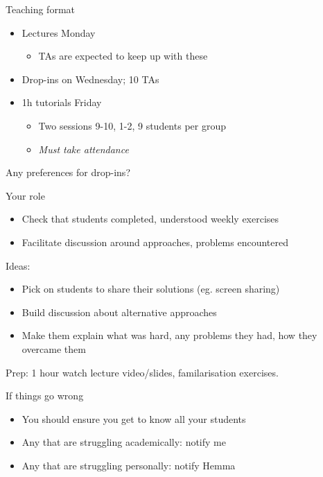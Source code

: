 \documentclass[presentation]{beamer}
\begin{document}
\begin{frame}[label={sec:org588aa54}]{Teaching format}
\begin{itemize}
\item Lectures Monday
\begin{itemize}
\item TAs are expected to keep up with these
\end{itemize}
\end{itemize}
\vfill
\begin{itemize}
\item Drop-ins on Wednesday; 10 TAs
\end{itemize}
\vfill
\begin{itemize}
\item 1h tutorials Friday
\begin{itemize}
\item Two sessions 9-10, 1-2, 9 students per group
\item \emph{\alert{Must take attendance}}
\end{itemize}
\end{itemize}
\vfill
Any preferences for drop-ins?
\end{frame}

\begin{frame}[label={sec:org836aa22}]{Your role}
\begin{itemize}
\item Check that students completed, understood weekly exercises
\item Facilitate discussion around approaches, problems encountered
\end{itemize}
\vfill     
Ideas:
\begin{itemize}
\item Pick on students to share their solutions (eg. screen sharing)
\item Build discussion about alternative approaches
\item Make them explain what was hard, any problems they had, how they overcame them
\end{itemize}
\vfill     
Prep: 1 hour watch lecture video/slides, familarisation exercises.
\end{frame}

\begin{frame}[label={sec:orgf822a3f}]{If things go wrong}
\begin{itemize}
\item You should ensure you get to know all your students
\end{itemize}
\vfill     
\begin{itemize}
\item Any that are struggling academically: notify me
\end{itemize}
\vfill     
\begin{itemize}
\item Any that are struggling personally: notify Hemma
\end{itemize}
\end{frame}
\end{document}
